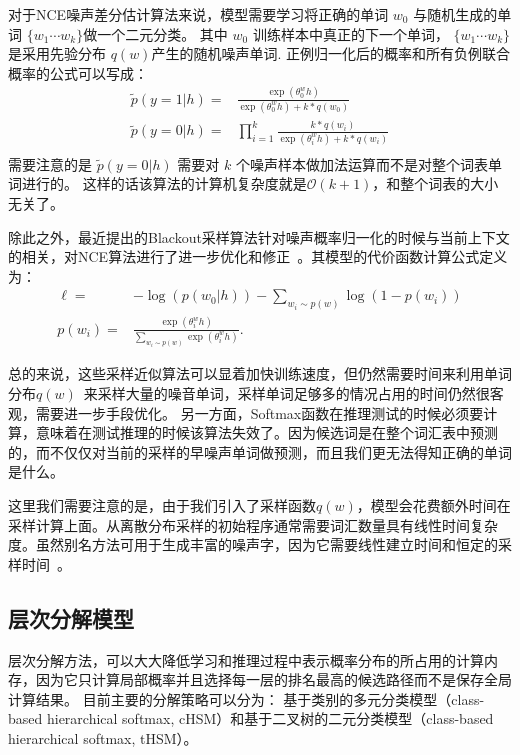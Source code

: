 对于NCE噪声差分估计算法来说，模型需要学习将正确的单词 $w_0$ 与随机生成的单词 $\{w_1\cdots w_k\}$做一个二元分类。 其中 $w_0$ 训练样本中真正的下一个单词， $\{w_1\cdots w_k\}$ 是采用先验分布  $q(w)$产生的随机噪声单词. 正例归一化后的概率和所有负例联合概率的公式可以写成：
\begin{equation}\label{equ:nce}
\begin{split}
  \tilde{p}(y=1|h)=&\frac{\exp( \theta^w_0 h)}{ \exp( \theta^w_0 h)+k *q(w_0)}\\
  \tilde{p}(y=0|h)=&\prod_{i=1}^{k}\frac{k *q(w_i)}{\exp( \theta^w_i h)+k *q(w_i)}\\
\end{split}
\end{equation}
需要注意的是 $\tilde{p}(y=0|h)$ 需要对 $k$ 个噪声样本做加法运算而不是对整个词表单词进行的。 这样的话该算法的计算机复杂度就是$\mathcal{O}(k+1)$，和整个词表的大小无关了。

除此之外，最近提出的Blackout采样算法针对噪声概率归一化的时候与当前上下文的相关，对NCE算法进行了进一步优化和修正~。其模型的代价函数计算公式定义为：
\begin{equation}
\begin{split}
  \ell=&-\log(p(w_0|h)) - \sum_{w_i \sim p(w)} \log(1 - p(w_i))\\
p(w_i) =& \frac{\exp(\theta^w_i h)}{\sum_{w_i \sim p(w)} \exp(\theta^w_i h)}.
\end{split}
\end{equation}

总的来说，这些采样近似算法可以显着加快训练速度，但仍然需要时间来利用单词分布$q(w)$~来采样大量的噪音单词，采样单词足够多的情况占用的时间仍然很客观，需要进一步手段优化。 另一方面，Softmax函数在推理测试的时候必须要计算，意味着在测试推理的时候该算法失效了。因为候选词是在整个词汇表中预测的，而不仅仅对当前的采样的早噪声单词做预测，而且我们更无法得知正确的单词是什么。

这里我们需要注意的是，由于我们引入了采样函数$q(w)$，模型会花费额外时间在采样计算上面。从离散分布采样的初始程序通常需要词汇数量具有线性时间复杂度。虽然别名方法可用于生成丰富的噪声字，因为它需要线性建立时间和恒定的采样时间~。

\subsection{层次分解模型}
层次分解方法，可以大大降低学习和推理过程中表示概率分布的所占用的计算内存，因为它只计算局部概率并且选择每一层的排名最高的候选路径而不是保存全局计算结果。
目前主要的分解策略可以分为： 基于类别的多元分类模型（class-based hierarchical softmax, cHSM）和基于二叉树的二元分类模型（class-based hierarchical softmax, tHSM）。

